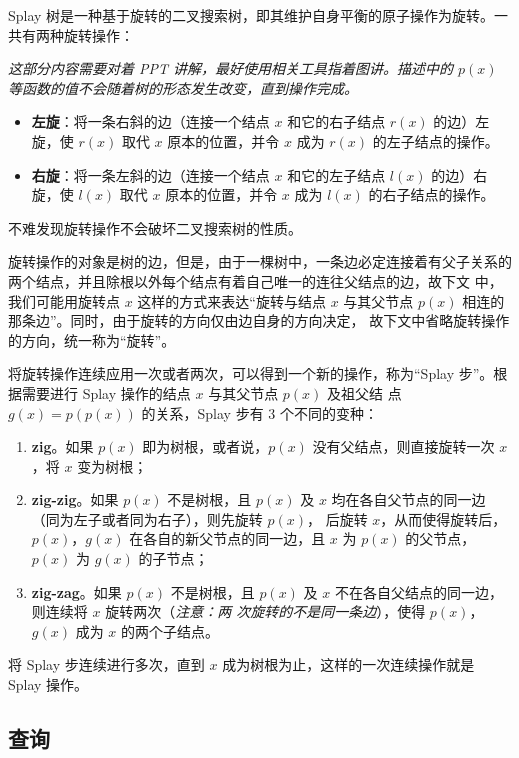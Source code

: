 \documentclass{ctexart}
\begin{document}
    Splay 树是一种基于旋转的二叉搜索树，即其维护自身平衡的原子操作为旋转。一共有两种旋转操作：

    \textit{这部分内容需要对着 PPT 讲解，最好使用相关工具指着图讲。描述中的 $p(x)$ 等函数的值不会随着树的形态发生改变，直到操作完成。}
    \begin{itemize}
        \item \textbf{左旋}：将一条右斜的边（连接一个结点 $x$ 和它的右子结点 $r(x)$ 的边）左旋，使 $r(x)$ 取代 $x$ 原本的位置，并令 $x$ 成为
              $r(x)$ 的左子结点的操作。
        \item \textbf{右旋}：将一条左斜的边（连接一个结点 $x$ 和它的左子结点 $l(x)$ 的边）右旋，使 $l(x)$ 取代 $x$ 原本的位置，并令 $x$ 成为
              $l(x)$ 的右子结点的操作。
    \end{itemize}

    不难发现旋转操作不会破坏二叉搜索树的性质。

    旋转操作的对象是树的边，但是，由于一棵树中，一条边必定连接着有父子关系的两个结点，并且除根以外每个结点有着自己唯一的连往父结点的边，故下文
    中，我们可能用旋转点 $x$ 这样的方式来表达“旋转与结点 $x$ 与其父节点 $p(x)$ 相连的那条边”。同时，由于旋转的方向仅由边自身的方向决定，
    故下文中省略旋转操作的方向，统一称为“旋转”。

    将旋转操作连续应用一次或者两次，可以得到一个新的操作，称为``Splay 步''。根据需要进行 Splay 操作的结点 $x$ 与其父节点 $p(x)$ 及祖父结
    点 $g(x) = p(p(x))$ 的关系，Splay 步有 3 个不同的变种：

    \begin{enumerate}
        \item \textbf{zig}。如果 $p(x)$ 即为树根，或者说，$p(x)$ 没有父结点，则直接旋转一次 $x$，将 $x$ 变为树根；
        \item \textbf{zig-zig}。如果 $p(x)$ 不是树根，且 $p(x)$ 及 $x$ 均在各自父节点的同一边（同为左子或者同为右子），则先旋转 $p(x)$，
              后旋转 $x$，从而使得旋转后，$p(x)$，$g(x)$ 在各自的新父节点的同一边，且 $x$ 为 $p(x)$ 的父节点，$p(x)$ 为 $g(x)$ 的子节点；
        \item \textbf{zig-zag}。如果 $p(x)$ 不是树根，且 $p(x)$ 及 $x$ 不在各自父结点的同一边，则连续将 $x$ 旋转两次（\textit{注意：两
              次旋转的不是同一条边}），使得 $p(x)$，$g(x)$ 成为 $x$ 的两个子结点。
    \end{enumerate}

    将 Splay 步连续进行多次，直到 $x$ 成为树根为止，这样的一次连续操作就是 Splay 操作。

    \subsection{查询}
\end{document}
